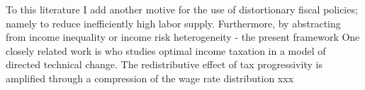 To this literature I add another motive for the use of distortionary fiscal policies; namely to reduce inefficiently high labor supply. Furthermore, by abstracting from income inequality or income risk heterogeneity - the present framework
One closely related work is \cite{Loebbing2019NationalChange} who studies optimal income taxation in a model of directed technical change. The redistributive effect of tax progressivity is amplified through a compression of the wage rate distribution xxx